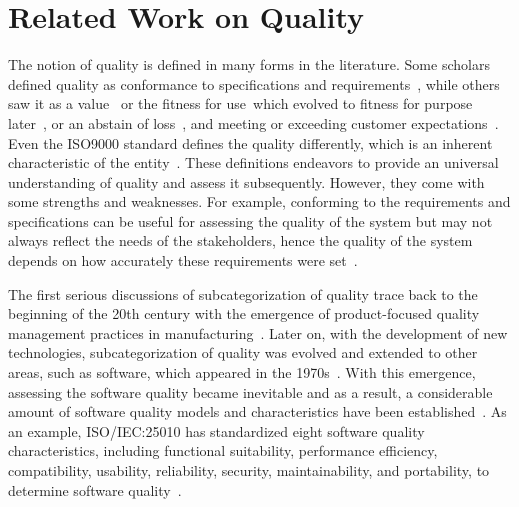 \documentclass{llncs}
\begin{document}
    \section{Related Work on Quality}
    The notion of quality is defined in many forms in the literature.
    Some scholars defined quality as conformance to specifications and
    requirements~\cite{ProductConformanceCostGilmore,LevittTheodoreProduction-LineApproach,QualityisFree},
    while others saw it as a value~\cite{QualityandCompetitionanEssayinEconomicTheory} or the 
    fitness for use~\cite{Juran1974}which evolved to fitness for purpose later~\cite{Juran2010},  
    or an abstain of loss~\cite{GenichiTaguchi}, and meeting or exceeding customer expectations~\cite{Groenrossstrategicmanagementandmarketing}. 
    Even the ISO9000 standard defines the quality differently, which is an inherent characteristic 
    of the entity~\cite{ISO9000}. 
    These definitions endeavors to provide an universal understanding of quality and assess it subsequently. However, 
    they come with some strengths and weaknesses.
    For example, conforming to the requirements and specifications can be useful for assessing the quality 
    of the system but may not always reflect the needs of the stakeholders,
    hence the quality of the system depends on how accurately these requirements were set~\cite{IEE7302014}. 
    
    The first serious discussions of subcategorization of quality trace back to the beginning of the 20th 
    century with the emergence of product-focused quality management practices in manufacturing~\cite{HistoryofControlEngineering}.
    Later on, with the development of new technologies, 
    subcategorization of quality was evolved and extended to other areas, 
    such as software, which appeared in the 1970s~\cite{ThePsychologyofComputerProgramming}.
    With this emergence, assessing the software quality became inevitable 
    and as a result, a considerable amount of software quality models and 
    characteristics have been established~\cite{SoftwareQualityModels,Charecteristicsofsoftwarequality,
    AnActivityBasedQualityModelforMaintainability}.
    As an example, ISO/IEC:25010 has standardized eight software quality characteristics, 
    including functional suitability, performance efficiency, compatibility, usability, 
    reliability, security, maintainability, 
    and portability, to determine software quality~\cite{ISO/IEC:25010}.
    
\end{document}

